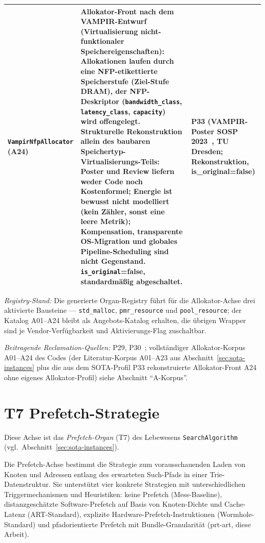 \begin{scriptsize}
\begin{longtable}{@{}>{\raggedright\arraybackslash}p{4.0cm} >{\raggedright\arraybackslash}p{6.5cm} >{\raggedright\arraybackslash}p{3.0cm}@{}}
\texttt{Vampir\allowbreak{}Nfp\allowbreak{}Allocator} (A24) & Allokator-Front nach dem VAMPIR-Entwurf (Virtualisierung nicht-funktionaler Speichereigenschaften): Allokationen laufen durch eine NFP-etikettierte Speicherstufe (Ziel-Stufe DRAM), der NFP-Deskriptor (\texttt{bandwidth\_\allowbreak{}class}, \texttt{latency\_\allowbreak{}class}, \texttt{capacity}) wird offengelegt. Strukturelle Rekonstruktion allein des baubaren Speichertyp-Virtualisierungs-Teils: Poster und Review liefern weder Code noch Kostenformel; Energie ist bewusst nicht modelliert (kein Zähler, sonst eine leere Metrik); Kompensation, transparente OS-Migration und globales Pipeline-Scheduling sind nicht Gegenstand. \texttt{is\_\allowbreak{}original}=false, standardmäßig abgeschaltet. & P33 (VAMPIR-Poster SOSP 2023~\cite{vampir2023sosp}, TU Dresden; Rekonstruktion, is\_\allowbreak{}original=false) \\
\bottomrule
\end{longtable}
\end{scriptsize}

\emph{Registry-Stand:} Die generierte Organ-Registry führt für die Allokator-Achse drei aktivierte Bausteine --- \texttt{std\_\allowbreak{}malloc}, \texttt{pmr\_\allowbreak{}resource} und \texttt{pool\_\allowbreak{}resource}; der Katalog A01--A24 bleibt als Angebots-Katalog erhalten, die übrigen Wrapper sind je Vendor-Verfügbarkeit und Aktivierungs-Flag zuschaltbar.

\emph{Beitragende Reclamation-Quellen:} P29, P30~\cite{mckenney2001rcu,michael2004hazard}; vollständiger Allokator-Korpus A01--A24 des Codes (der Literatur-Korpus A01--A23 aus Abschnitt~\ref{sec:sota-instances} plus die aus dem SOTA-Profil P33 rekonstruierte Allokator-Front A24 ohne eigenes Allokator-Profil) siehe Abschnitt \enquote{A-Korpus}.

\section{T7 Prefetch-Strategie}

Diese Achse ist das \emph{Prefetch-Organ} (T7) des Lebewesens \texttt{SearchAlgorithm} (vgl.\ Abschnitt~\ref{sec:sota-instances}).

Die Prefetch-Achse bestimmt die Strategie zum vorausschauenden Laden von Knoten und Adressen entlang des erwarteten Such-Pfads in einer Trie-Datenstruktur. Sie unterstützt vier konkrete Strategien mit unterschiedlichen Triggermechanismen und Heuristiken: keine Prefetch (Mess-Baseline), distanzgeschätzte Software-Prefetch auf Basis von Knoten-Dichte und Cache-Latenz (ART-Standard), explizite Hardware-Prefetch-Instruktionen (Wormhole-Standard) und pfadorientierte Prefetch mit Bundle-Granularität (prt-art, diese Arbeit).

